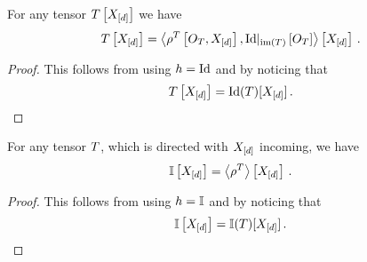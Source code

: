 \begin{corollary}
    \label{cor:rhoToNormal}
    For any tensor $T\left[X_{[d]}\right]$ we have
    \begin{align*}
        T\left[X_{[d]}\right]
        = \left\langle \rho^{T}\left[O_{T},X_{[d]}\right],{\mathrm{Id}}|_{\mathrm{im}\left(T\right)}\left[O_{T}\right]\right\rangle \left[ X_{[d]} \right] \, .
    \end{align*}
\end{corollary}
\begin{proof}
    This follows from  using $h=\mathrm{Id}$ and by noticing that
    \begin{align*}
        T\left[X_{[d]}\right] = \mathrm{Id}(T)[X_{[d]}] \, .
    \end{align*}
\end{proof}

\begin{corollary}
    \label{cor:onesHead}
    For any tensor $T$, which is directed with $X_{[d]}$ incoming, we have
    \[ \mathbb{I}\left[X_{[d]}\right] = \left\langle \rho^{T}\right\rangle \left[ X_{[d]} \right] \, . \]
\end{corollary}
\begin{proof}
    This follows from  using $h=\mathbb{I}$ and by noticing that
    \begin{align*}
        \mathbb{I}\left[X_{[d]}\right] = \mathbb{I}(T)[X_{[d]}] \, .
    \end{align*}
\end{proof}


